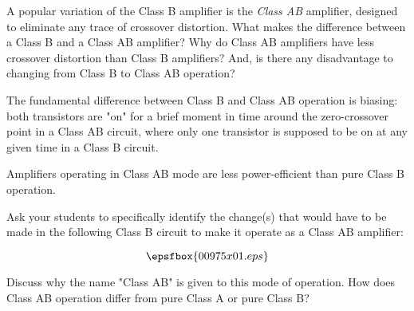 

A popular variation of the Class B amplifier is the {\it Class AB} amplifier, designed to eliminate any trace of crossover distortion.  What makes the difference between a Class B and a Class AB amplifier?  Why do Class AB amplifiers have less crossover distortion than Class B amplifiers?  And, is there any disadvantage to changing from Class B to Class AB operation?







The fundamental difference between Class B and Class AB operation is biasing: both transistors are "on" for a brief moment in time around the zero-crossover point in a Class AB circuit, where only one transistor is supposed to be on at any given time in a Class B circuit.

Amplifiers operating in Class AB mode are less power-efficient than pure Class B operation.







Ask your students to specifically identify the change(s) that would have to be made in the following Class B circuit to make it operate as a Class AB amplifier:

$$\epsfbox{00975x01.eps}$$

Discuss why the name "Class AB" is given to this mode of operation.  How does Class AB operation differ from pure Class A or pure Class B?




